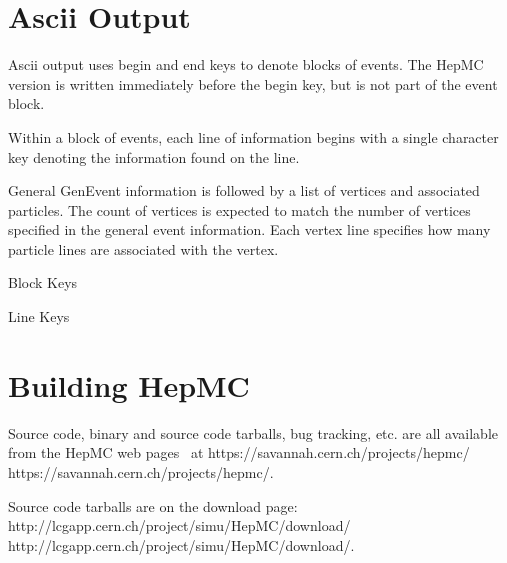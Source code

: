 \documentclass[11pt,letterpaper]{article}
\begin{document}
\section{Ascii Output}
\label{iogenevent}

Ascii output uses begin and end keys to denote blocks of events.
The HepMC version is written immediately before the begin key, but 
is not part of the event block.

Within a block of events, each line of information begins with a 
single character key denoting the information found on the line.

General GenEvent information is followed by a list of vertices 
and associated particles.  The count of vertices is expected to match the 
number of vertices specified in the general event information.
Each vertex line specifies how many particle lines are associated 
with the vertex.
\vspace{0.1cm}
\begin{myitemize}{Block Keys}
\end{myitemize}
\begin{myitemize}{Line Keys}
\end{myitemize}

%
%

\section{Building HepMC}

Source code, binary and source code tarballs, bug tracking, etc. are
all available from the HepMC web pages~\cite{LCGHepMC} at  
\htmladdnormallink
{https://savannah.cern.ch/projects/hepmc/}
{https://savannah.cern.ch/projects/hepmc/}.

Source code tarballs are on the download page:
\htmladdnormallink
{http://lcgapp.cern.ch/project/simu/HepMC/download/}
{http://lcgapp.cern.ch/project/simu/HepMC/download/}.
\end{document}
